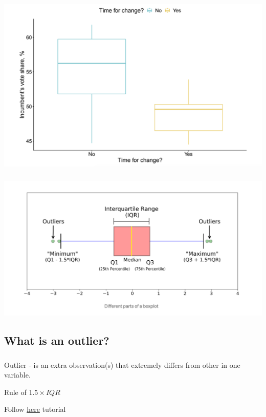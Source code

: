 \documentclass[t, 11pt]{beamer}
\begin{document}
    	\begin{frame}
	\frametitle{\insertsection} 
\framesubtitle{\insertsubsection} 
	\begin{center}
		\includegraphics[scale=0.3]{boxp1}
	\end{center}

	\end{frame}	

    	\begin{frame}
	\frametitle{\insertsection} 
	\framesubtitle{\insertsubsection} 
	\begin{center}
		\includegraphics[scale=0.4]{boxp2}
	\end{center}
	
\end{frame}	

\subsection{What is an outlier?}
    	\begin{frame}
	\frametitle{\insertsection} 
	\framesubtitle{\insertsubsection} 
	
	Outlier - is an extra observation(s) that extremely differs from other in one variable.
	
	\vspace{1cm}
	
	Rule of $1.5 \times IQR$
	
	\vspace{1cm}
	
	Follow \href{https://www.khanacademy.org/math/statistics-probability/summarizing-quantitative-data/box-whisker-plots/a/identifying-outliers-iqr-rule}{here} tutorial
\end{frame}	
\end{document}
